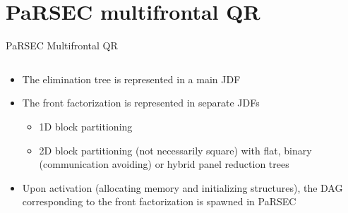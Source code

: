 \documentclass{beamer}
\newcommand{\db}[1]{\textcolor{amblu}{#1}}
\begin{document}

\part{PaRSEC multifrontal QR}

\begin{frame}[plain]
  \partpage
\end{frame}

\begin{frame}{PaRSEC Multifrontal QR}
  
  \begin{columns}

    \begin{column}{0.5\textwidth}

      \begin{itemize}
      \item The \db{elimination tree} is represented in a main JDF
      \item The \db{front factorization} is represented in separate JDFs
      \begin{itemize}
      \item 1D block partitioning
      \item 2D block partitioning (not necessarily square) with flat,
        binary (communication avoiding) or hybrid panel reduction
        trees
      \end{itemize}
        
      \item Upon \alert{activation} (allocating memory and
        initializing structures), the DAG corresponding to the front
        factorization is spawned in PaRSEC
      \end{itemize}

    \end{column}

    \begin{column}{0.5\textwidth}


    \end{column}

  \end{columns}
  
\end{frame}
\end{document}
